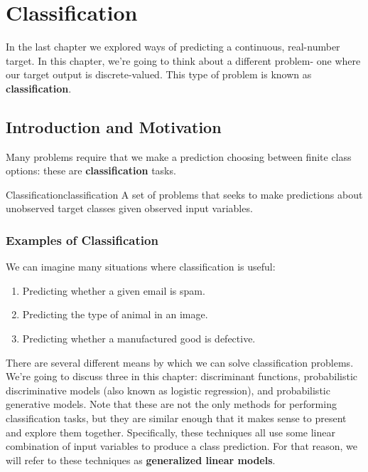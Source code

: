 \chapter{Classification}
In the last chapter we explored ways of predicting a continuous, real-number target. In this chapter, we're going to think about a different problem- one where our target output is discrete-valued. This type of problem is known as \textbf{classification}.

\section{Introduction and Motivation}
Many problems require that we make a prediction choosing between finite class options: these are \textbf{classification} tasks.

\begin{definition}{Classification}{classification}
A set of problems that seeks to make predictions about unobserved target classes given observed input variables.
\end{definition}

\subsection{Examples of Classification}
We can imagine many situations where classification is useful:
\begin{enumerate}
	\item Predicting whether a given email is spam.
    \item Predicting the type of animal in an image.
    \item Predicting whether a manufactured good is defective.
\end{enumerate}

There are several different means by which we can solve classification problems. We're going to discuss three in this chapter: discriminant functions, probabilistic discriminative models (also known as logistic regression), and probabilistic generative models. Note that these are not the only methods for performing classification tasks, but they are similar enough that it makes sense to present and explore them together. Specifically, these techniques all use some linear combination of input variables to produce a class prediction. For that reason, we will refer to these techniques as \textbf{generalized linear models}.

